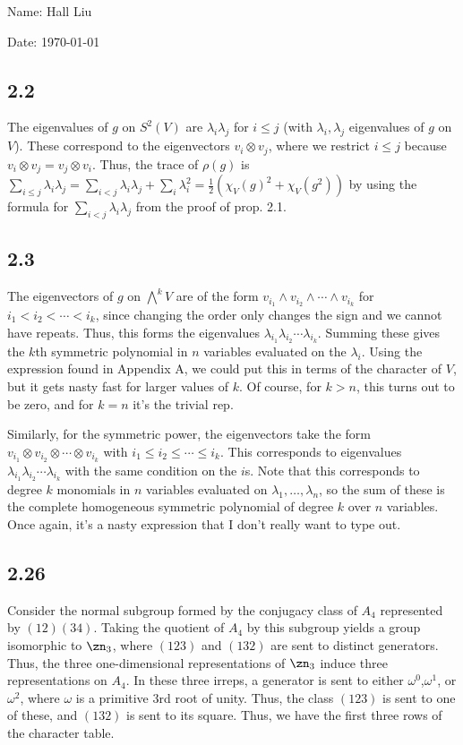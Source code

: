 \documentclass{article}
\begin{document}
Name: Hall Liu

Date: \today 
\vspace{1.5cm}
\subsection*{2.2}
The eigenvalues of $g$ on $S^2(V)$ are $\lambda_i\lambda_j$ for $i\leq j$ (with $\lambda_i,\lambda_j$ eigenvalues of $g$ on $V$). These correspond to the eigenvectors $v_i\otimes v_j$, where we restrict $i\leq j$ because $v_i\otimes v_j=v_j\otimes v_i$. Thus, the trace of $\rho(g)$ is $\sum_{i\leq j}\lambda_i\lambda_j=\sum_{i<j}\lambda_i\lambda_j+\sum_i\lambda_i^2=\frac{1}{2}(\chi_V(g)^2+\chi_V(g^2))$ by using the formula for $\sum_{i<j}\lambda_i\lambda_j$ from the proof of prop. 2.1.
\subsection*{2.3}
The eigenvectors of $g$ on $\bigwedge^kV$ are of the form $v_{i_1}\wedge v_{i_2}\wedge\cdots\wedge v_{i_k}$ for $i_1<i_2<\cdots<i_k$, since changing the order only changes the sign and we cannot have repeats. Thus, this forms the eigenvalues $\lambda_{i_1}\lambda_{i_2}\cdots\lambda_{i_k}$. Summing these gives the $k$th symmetric polynomial in $n$ variables evaluated on the $\lambda_i$. Using the expression found in Appendix A, we could put this in terms of the character of $V$, but it gets nasty fast for larger values of $k$. Of course, for $k>n$, this turns out to be zero, and for $k=n$ it's the trivial rep.

Similarly, for the symmetric power, the eigenvectors take the form $v_{i_1}\otimes v_{i_2}\otimes\cdots\otimes v_{i_k}$ with $i_1\leq i_2\leq\cdots\leq i_k$. This corresponds to eigenvalues $\lambda_{i_1}\lambda_{i_2}\cdots\lambda_{i_k}$ with the same condition on the $i$s. Note that this corresponds to degree $k$ monomials in $n$ variables evaluated on $\lambda_1,\ldots,\lambda_n$, so the sum of these is the complete homogeneous symmetric polynomial of degree $k$ over $n$ variables. Once again, it's a nasty expression that I don't really want to type out.
\subsection*{2.26}
Consider the normal subgroup formed by the conjugacy class of $A_4$ represented by $(1 2)(3 4)$. Taking the quotient of $A_4$ by this subgroup yields a group isomorphic to $\zn_3$, where $(123)$ and $(132)$ are sent to distinct generators. Thus, the three one-dimensional representations of $\zn_3$ induce three representations on $A_4$. In these three irreps, a generator is sent to either $\omega^0$,$\omega^1$, or $\omega^2$, where $\omega$ is a primitive $3$rd root of unity. Thus, the class $(123)$ is sent to one of these, and $(132)$ is sent to its square. Thus, we have the first three rows of the character table.
\end{document}
